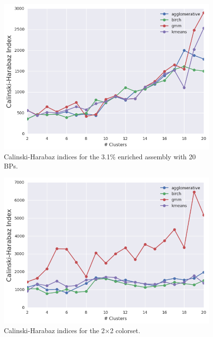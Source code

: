 \begin{figure}[h!]
\centering
\includegraphics[width=0.87\linewidth]{figures/results/model-select/assm-31-20BPs/ch-combined-U238-capture-1}
\vspace{2mm}
\caption[Calinski-Harabaz indices for the 3.1\% enriched assembly with 20 BPs]{Calinski-Harabaz indices for the 3.1\% enriched assembly with 20 \acp{BP}.}
\label{fig:chap11-assm-31-20BPs-ch-index}
\end{figure}

\clearpage

\begin{figure}[h!]
\centering
\includegraphics[width=0.87\linewidth]{figures/results/model-select/2x2/ch-combined-U238-capture-1}
\vspace{2mm}
\caption[Calinski-Harabaz indices for the 2$\times$2 colorset]{Calinski-Harabaz indices for the 2$\times$2 colorset.}
\label{fig:chap11-2x2-ch-index}
\end{figure}

